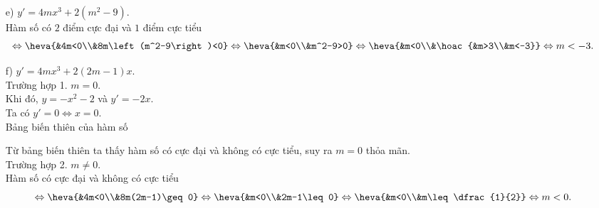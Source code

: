 \begin{vd}
{\begin{enumerate}
\item[e)] $y'=4mx^3+2\left(m^2-9\right)$. \\
Hàm số có $2$ điểm cực đại và $1$ điểm cực tiểu
\[\Leftrightarrow\heva{&4m<0\\&8m\left(m^2-9\right)<0}\Leftrightarrow\heva{&m<0\\&m^2-9>0}\Leftrightarrow\heva{&m<0\\&\hoac{&m>3\\&m<-3}}\Leftrightarrow m<-3.\]
\item[f)] $y'=4mx^3+2(2m-1)x$. \\
Trường hợp 1. $m=0$. \\
Khi đó, $y=-x^2-2$ và $y'=-2x$. \\
Ta có $y'=0\Leftrightarrow x=0$. \\
Bảng biến thiên của hàm số
\begin{center}
\end{center}
Từ bảng biến thiên ta thấy hàm số có cực đại và không có cực tiểu, suy ra $m=0$ thỏa mãn. \\
Trường hợp 2. $m\neq0$. \\
Hàm số có cực đại và không có cực tiểu
\[\Leftrightarrow\heva{&4m<0\\&8m(2m-1)\geq0}\Leftrightarrow\heva{&m<0\\&2m-1\leq0}\Leftrightarrow\heva{&m<0\\&m\leq\dfrac{1}{2}}\Leftrightarrow m<0.\]
\end{enumerate}
}
\end{vd}

